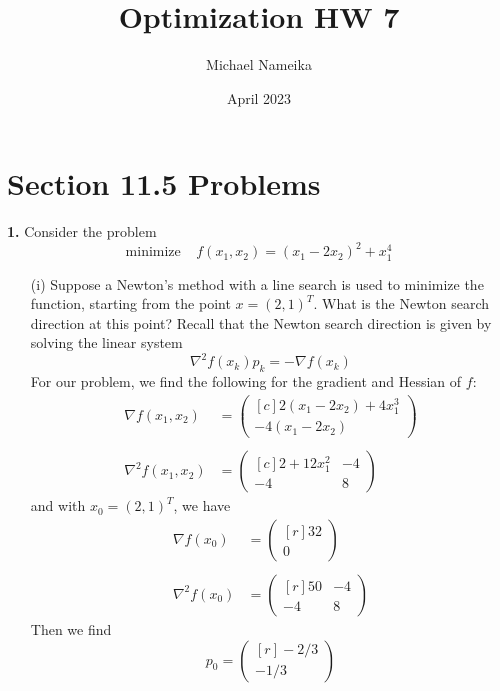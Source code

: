 \documentclass{article}
\title{Optimization HW 7}
\author{Michael Nameika}
\date{April 2023}
\begin{document}
\maketitle

\section*{Section 11.5 Problems}
\textbf{1.} Consider the problem
\[\text{minimize} \:\:\:\:\: f(x_1, x_2) = (x_1 - 2x_2)^2 + x_1^4\]
\begin{itemize}
    \item[(i)] Suppose a Newton's method with a line search is used to minimize the function, starting from the point $x = (2,1)^T$. What is the Newton search direction at this point?
    \newline\newline
    Recall that the Newton search direction is given by solving the linear system
    \[\nabla^2f(x_k)p_k = -\nabla f(x_k)\]
    For our problem, we find the following for the gradient and Hessian of $f$:
    \begin{align*}
        \nabla f(x_1,x_2) &= \begin{pmatrix*}[c]
            2(x_1 - 2x_2) + 4x_1^3\\
            -4(x_1 - 2x_2)
        \end{pmatrix*}\\ \\
        \nabla^2f(x_1,x_2) &= \begin{pmatrix*}[c]
            2 + 12x_1^2 & -4\\
            -4 & 8
        \end{pmatrix*}
    \end{align*}
    and with $x_0 = (2,1)^T$, we have
    \begin{align*}
        \nabla f(x_0) &= \begin{pmatrix*}[r]
            32\\
            0
        \end{pmatrix*}\\
        \\
        \nabla^2f(x_0) &= \begin{pmatrix*}[r]
            50 & -4\\
            -4 & 8
        \end{pmatrix*}
    \end{align*}
    Then we find 
    \[p_0 = \begin{pmatrix*}[r]
        -2/3\\
        -1/3
    \end{pmatrix*}\]


\end{itemize}
\end{document}
